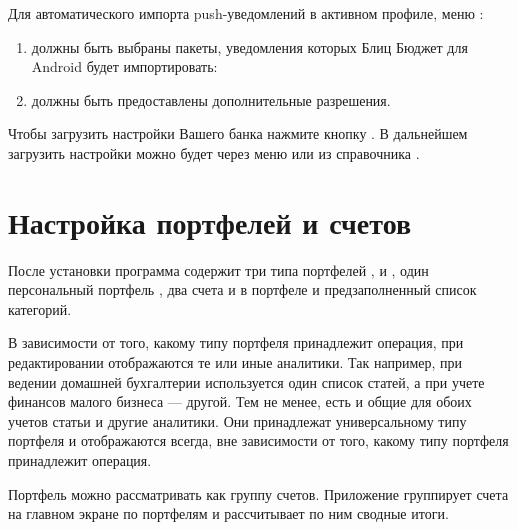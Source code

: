 \documentclass[a4paper,10pt,russian]{sphinxmanual}
\begin{document}
Для автоматического импорта push-уведомлений в активном профиле, меню :
\begin{enumerate}
\def\theenumi{\arabic{enumi}}
\def\labelenumi{\theenumi .}
\makeatletter\def\p@enumii{\p@enumi \theenumi .}\makeatother
\item {} 
должны быть выбраны пакеты, уведомления которых Блиц Бюджет для Android будет импортировать:

\item {} 
должны быть предоставлены дополнительные разрешения.

\end{enumerate}

Чтобы загрузить настройки Вашего банка нажмите кнопку . В дальнейшем загрузить
настройки можно будет через меню  или из справочника
.

\noindent{}
\noindent{}


\section{Настройка портфелей и счетов}
\label{\detokenize{getting-started:id4}}
После установки программа содержит три типа портфелей ,  и ,
один персональный портфель , два счета  и  в портфеле  и предзаполненный
список категорий.

В зависимости от того, какому типу портфеля принадлежит операция, при редактировании отображаются те или иные аналитики.  Так например,
при ведении домашней бухгалтерии используется один список статей, а при учете финансов малого бизнеса — другой.
Тем не менее, есть и общие для обоих учетов статьи и другие аналитики. Они принадлежат универсальному типу портфеля и
отображаются всегда, вне зависимости от того, какому типу портфеля принадлежит операция.

Портфель можно рассматривать как группу счетов. Приложение группирует счета на главном экране по портфелям и рассчитывает
по ним сводные итоги.
\end{document}
